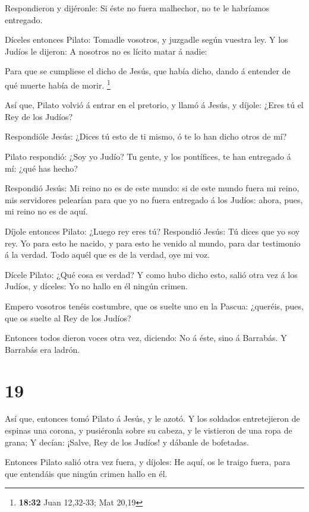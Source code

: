  Respondieron y dijéronle: Si éste no fuera malhechor, no
te le habríamos entregado.

 Díceles entonces Pilato: Tomadle vosotros, y juzgadle
según vuestra ley. Y los Judíos le dijeron: A nosotros no es lícito
matar á nadie:

 Para que se cumpliese el dicho de Jesús, que había dicho,
dando á entender de qué muerte había de morir. \footnote{\textbf{18:32}
  Juan 12,32-33; Mat 20,19}

 Así que, Pilato volvió á entrar en el pretorio, y llamó á
Jesús, y díjole: ¿Eres tú el Rey de los Judíos?

 Respondióle Jesús: ¿Dices tú esto de ti mismo, ó te lo han
dicho otros de mí?

 Pilato respondió: ¿Soy yo Judío? Tu gente, y los
pontífices, te han entregado á mí: ¿qué has hecho?

 Respondió Jesús: Mi reino no es de este mundo: si de este
mundo fuera mi reino, mis servidores pelearían para que yo no fuera
entregado á los Judíos: ahora, pues, mi reino no es de aquí.

 Díjole entonces Pilato: ¿Luego rey eres tú? Respondió
Jesús: Tú dices que yo soy rey. Yo para esto he nacido, y para esto he
venido al mundo, para dar testimonio á la verdad. Todo aquél que es de
la verdad, oye mi voz.

 Dícele Pilato: ¿Qué cosa es verdad? Y como hubo dicho
esto, salió otra vez á los Judíos, y díceles: Yo no hallo en él ningún
crimen.

 Empero vosotros tenéis costumbre, que os suelte uno en la
Pascua: ¿queréis, pues, que os suelte al Rey de los Judíos?

 Entonces todos dieron voces otra vez, diciendo: No á éste,
sino á Barrabás. Y Barrabás era ladrón.

\hypertarget{section-18}{%
\section{19}\label{section-18}}

 Así que, entonces tomó Pilato á Jesús, y le azotó.
 Y los soldados entretejieron de espinas una corona, y
pusiéronla sobre su cabeza, y le vistieron de una ropa de grana;
 Y decían: ¡Salve, Rey de los Judíos! y dábanle de
bofetadas.

 Entonces Pilato salió otra vez fuera, y díjoles: He aquí,
os le traigo fuera, para que entendáis que ningún crimen hallo en él.

